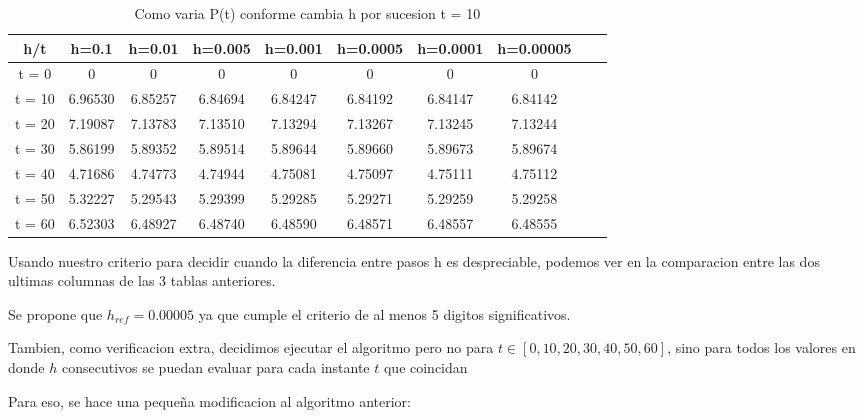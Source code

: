 \begin{table}[H]
    \centering
    \begin{tabular}{|c|c|c|c|c|c|c|c|c|c|}
        \hline
        h/t  & h=0.1 & h=0.01 & h=0.005 & h=0.001 & h=0.0005 & h=0.0001 & h=0.00005\\
        \hline
        t = 0 & 0 & 0 & 0 & 0 & 0 & 0 & 0 \\
        \hline
        t = 10 & 6.96530 & 6.85257 & 6.84694 & 6.84247 & 6.84192 & 6.84147 & 6.84142\\
        \hline
        t = 20 & 7.19087 & 7.13783 & 7.13510 & 7.13294 & 7.13267 & 7.13245 & 7.13244\\
        \hline
        t = 30 & 5.86199 & 5.89352 & 5.89514 & 5.89644 & 5.89660 & 5.89673 & 5.89674 \\
        \hline
        t = 40 & 4.71686 & 4.74773 & 4.74944 & 4.75081 & 4.75097 & 4.75111 & 4.75112\\
        \hline
        t = 50 & 5.32227 & 5.29543 & 5.29399 & 5.29285 & 5.29271 & 5.29259 & 5.29258 \\
        \hline
        t = 60 & 6.52303 & 6.48927 & 6.48740 & 6.48590 & 6.48571 & 6.48557 & 6.48555\\
        \hline
    \end{tabular}
    \caption{Como varia P(t) conforme cambia h por sucesion t = 10}
\end{table}


Usando nuestro criterio para decidir cuando la diferencia entre pasos h es despreciable, podemos ver en la comparacion entre las dos ultimas columnas de las 3 tablas anteriores.

Se propone que $h_{ref} = 0.00005$ ya que cumple el criterio de al menos 5 digitos significativos.

Tambien, como verificacion extra, decidimos ejecutar el algoritmo pero no para $t \in [0,10,20,30,40,50,60]$, sino para todos los valores en donde $h$ consecutivos se puedan evaluar para cada instante $t$ que coincidan

Para eso, se hace una pequeña modificacion al algoritmo anterior:

